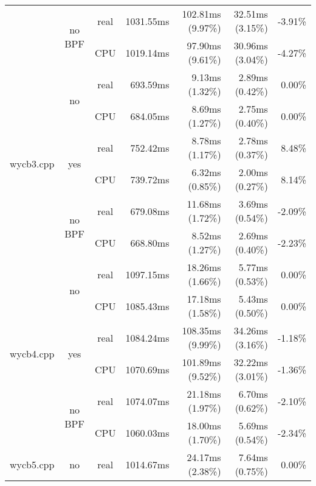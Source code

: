 \documentclass[en]{pracamgr}
\begin{document}
\begin{small}
\begin{longtable}{|l|c|c|r|r|r|r|}
                            \cline{2-7}
                            & \multirow{2}{*}{no BPF} & real & 1031.55ms & 102.81ms (9.97\%) & 32.51ms (3.15\%) & -3.91\% \\*
                            &                         & CPU  & 1019.14ms & 97.90ms (9.61\%) & 30.96ms (3.04\%) & -4.27\% \\
\hline
\multirow{6}{*}{wycb3.cpp}  & \multirow{2}{*}{no}     & real & 693.59ms & 9.13ms (1.32\%) & 2.89ms (0.42\%) & 0.00\% \\*
                            &                         & CPU  & 684.05ms & 8.69ms (1.27\%) & 2.75ms (0.40\%) & 0.00\% \\*
                            \cline{2-7}
                            & \multirow{2}{*}{yes}    & real & 752.42ms & 8.78ms (1.17\%) & 2.78ms (0.37\%) & 8.48\% \\*
                            &                         & CPU  & 739.72ms & 6.32ms (0.85\%) & 2.00ms (0.27\%) & 8.14\% \\*
                            \cline{2-7}
                            & \multirow{2}{*}{no BPF} & real & 679.08ms & 11.68ms (1.72\%) & 3.69ms (0.54\%) & -2.09\% \\*
                            &                         & CPU  & 668.80ms & 8.52ms (1.27\%) & 2.69ms (0.40\%) & -2.23\% \\
\hline
\multirow{6}{*}{wycb4.cpp}  & \multirow{2}{*}{no}     & real & 1097.15ms & 18.26ms (1.66\%) & 5.77ms (0.53\%) & 0.00\% \\*
                            &                         & CPU  & 1085.43ms & 17.18ms (1.58\%) & 5.43ms (0.50\%) & 0.00\% \\*
                            \cline{2-7}
                            & \multirow{2}{*}{yes}    & real & 1084.24ms & 108.35ms (9.99\%) & 34.26ms (3.16\%) & -1.18\% \\*
                            &                         & CPU  & 1070.69ms & 101.89ms (9.52\%) & 32.22ms (3.01\%) & -1.36\% \\*
                            \cline{2-7}
                            & \multirow{2}{*}{no BPF} & real & 1074.07ms & 21.18ms (1.97\%) & 6.70ms (0.62\%) & -2.10\% \\*
                            &                         & CPU  & 1060.03ms & 18.00ms (1.70\%) & 5.69ms (0.54\%) & -2.34\% \\
\hline
\multirow{6}{*}{wycb5.cpp}  & \multirow{2}{*}{no}     & real & 1014.67ms & 24.17ms (2.38\%) & 7.64ms (0.75\%) & 0.00\% \\*

\end{longtable}
\end{small}
\end{document}
